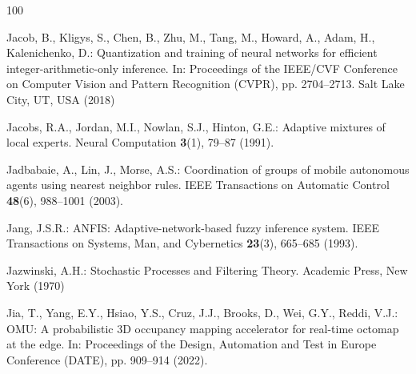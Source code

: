 \documentclass[graybox,envcountchap]{style/SNmono}
\begin{document}
\begin{thebibliography}{100}
{\color{red} 
Jacob, B., Kligys, S., Chen, B., Zhu, M., Tang, M., Howard, A., Adam, H.,
  Kalenichenko, D.: Quantization and training of neural networks for efficient
  integer-arithmetic-only inference.
\newblock In: Proceedings of the IEEE/CVF Conference on Computer Vision and
  Pattern Recognition (CVPR), pp. 2704--2713. Salt Lake City, UT, USA (2018)

\par}

Jacobs, R.A., Jordan, M.I., Nowlan, S.J., Hinton, G.E.: Adaptive mixtures of
  local experts.
\newblock Neural Computation \textbf{3}(1), 79--87 (1991).
\newblock {}



Jadbabaie, A., Lin, J., Morse, A.S.: Coordination of groups of mobile
  autonomous agents using nearest neighbor rules.
\newblock IEEE Transactions on Automatic Control \textbf{48}(6), 988--1001
  (2003).
\newblock {}



Jang, J.S.R.: {ANFIS}: Adaptive-network-based fuzzy inference system.
\newblock IEEE Transactions on Systems, Man, and Cybernetics \textbf{23}(3),
  665--685 (1993).
\newblock {}


{\color{red} 
Jazwinski, A.H.: Stochastic Processes and Filtering Theory.
\newblock Academic Press, New York (1970)

\par}

Jia, T., Yang, E.Y., Hsiao, Y.S., Cruz, J.J., Brooks, D., Wei, G.Y., Reddi,
  V.J.: {OMU}: A probabilistic {3D} occupancy mapping accelerator for real-time
  octomap at the edge.
\newblock In: Proceedings of the Design, Automation and Test in Europe
  Conference (DATE), pp. 909--914 (2022).
\newblock {}



\end{thebibliography}
\end{document}
